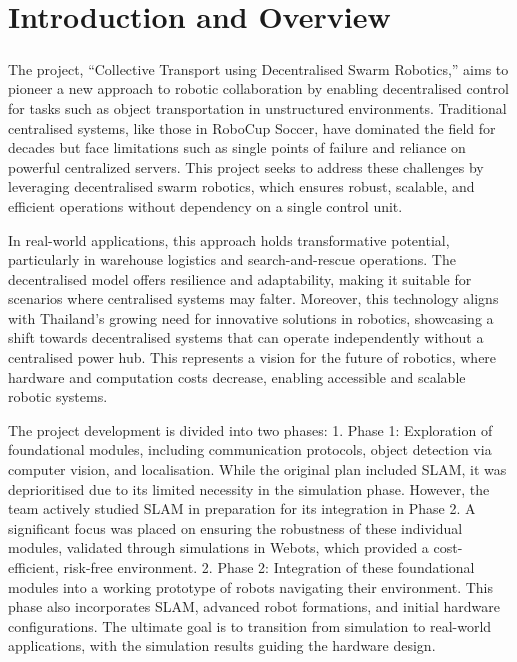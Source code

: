 \chapter{Introduction and Overview}
\paragraph*{}
The project, “Collective Transport using Decentralised Swarm Robotics,” aims to pioneer a new approach to robotic collaboration by enabling decentralised control for tasks such as object transportation in unstructured environments. Traditional centralised systems, like those in RoboCup Soccer, have dominated the field for decades but face limitations such as single points of failure and reliance on powerful centralized servers. This project seeks to address these challenges by leveraging decentralised swarm robotics, which ensures robust, scalable, and efficient operations without dependency on a single control unit.

In real-world applications, this approach holds transformative potential, particularly in warehouse logistics and search-and-rescue operations. The decentralised model offers resilience and adaptability, making it suitable for scenarios where centralised systems may falter. Moreover, this technology aligns with Thailand’s growing need for innovative solutions in robotics, showcasing a shift towards decentralised systems that can operate independently without a centralised power hub. This represents a vision for the future of robotics, where hardware and computation costs decrease, enabling accessible and scalable robotic systems.

The project development is divided into two phases:
	1.	Phase 1: Exploration of foundational modules, including communication protocols, object detection via computer vision, and localisation. While the original plan included SLAM, it was deprioritised due to its limited necessity in the simulation phase. However, the team actively studied SLAM in preparation for its integration in Phase 2. A significant focus was placed on ensuring the robustness of these individual modules, validated through simulations in Webots, which provided a cost-efficient, risk-free environment.
	2.	Phase 2: Integration of these foundational modules into a working prototype of robots navigating their environment. This phase also incorporates SLAM, advanced robot formations, and initial hardware configurations. The ultimate goal is to transition from simulation to real-world applications, with the simulation results guiding the hardware design.

